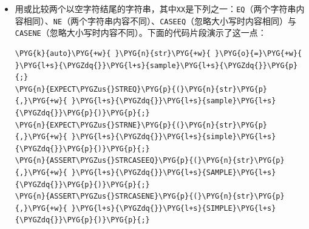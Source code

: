 \begin{itemize}
\begin{codeblockbg}
\begin{Verbatim}[commandchars=\\\{\},breaklines=true,breakanywhere=true,fontsize=\codefont,xleftmargin=17bp]
\PYG{k}{auto}\PYG{+w}{ }\PYG{n}{a}\PYG{+w}{ }\PYG{o}{=}\PYG{+w}{ }\PYG{l+m+mi}{42}\PYG{p}{,}\PYG{+w}{ }\PYG{n}{b}\PYG{+w}{ }\PYG{o}{=}\PYG{+w}{ }\PYG{l+m+mi}{10}\PYG{p}{;}
\PYG{n}{EXPECT\PYGZus{}EQ}\PYG{p}{(}\PYG{n}{a}\PYG{p}{,}\PYG{+w}{ }\PYG{l+m+mi}{42}\PYG{p}{)}\PYG{p}{;}
\PYG{n}{EXPECT\PYGZus{}NE}\PYG{p}{(}\PYG{n}{a}\PYG{p}{,}\PYG{+w}{ }\PYG{n}{b}\PYG{p}{)}\PYG{p}{;}
\PYG{n}{EXPECT\PYGZus{}LT}\PYG{p}{(}\PYG{n}{b}\PYG{p}{,}\PYG{+w}{ }\PYG{n}{a}\PYG{p}{)}\PYG{p}{;}
\PYG{n}{EXPECT\PYGZus{}LE}\PYG{p}{(}\PYG{n}{b}\PYG{p}{,}\PYG{+w}{ }\PYG{l+m+mi}{11}\PYG{p}{)}\PYG{p}{;}
\PYG{n}{EXPECT\PYGZus{}GT}\PYG{p}{(}\PYG{n}{a}\PYG{p}{,}\PYG{+w}{ }\PYG{n}{b}\PYG{p}{)}\PYG{p}{;}
\PYG{n}{EXPECT\PYGZus{}GE}\PYG{p}{(}\PYG{n}{b}\PYG{p}{,}\PYG{+w}{ }\PYG{l+m+mi}{10}\PYG{p}{)}\PYG{p}{;}
\end{Verbatim}
\end{codeblockbg}



\item 用或比较两个以空字符结尾的字符串，其中\texttt{XX}是下列之一：\texttt{EQ}（两个字符串内容相同）、\texttt{NE}（两个字符串内容不同）、\texttt{CASEEQ}（忽略大小写时内容相同）与\texttt{CASENE}（忽略大小写时内容不同）。下面的代码片段演示了这一点：



\begin{codeblockbg}
\begin{Verbatim}[commandchars=\\\{\},breaklines=true,breakanywhere=true,fontsize=\codefont,xleftmargin=17bp]
\PYG{k}{auto}\PYG{+w}{ }\PYG{n}{str}\PYG{+w}{ }\PYG{o}{=}\PYG{+w}{ }\PYG{l+s}{\PYGZdq{}}\PYG{l+s}{sample}\PYG{l+s}{\PYGZdq{}}\PYG{p}{;}
\PYG{n}{EXPECT\PYGZus{}STREQ}\PYG{p}{(}\PYG{n}{str}\PYG{p}{,}\PYG{+w}{ }\PYG{l+s}{\PYGZdq{}}\PYG{l+s}{sample}\PYG{l+s}{\PYGZdq{}}\PYG{p}{)}\PYG{p}{;}
\PYG{n}{EXPECT\PYGZus{}STRNE}\PYG{p}{(}\PYG{n}{str}\PYG{p}{,}\PYG{+w}{ }\PYG{l+s}{\PYGZdq{}}\PYG{l+s}{simple}\PYG{l+s}{\PYGZdq{}}\PYG{p}{)}\PYG{p}{;}
\PYG{n}{ASSERT\PYGZus{}STRCASEEQ}\PYG{p}{(}\PYG{n}{str}\PYG{p}{,}\PYG{+w}{ }\PYG{l+s}{\PYGZdq{}}\PYG{l+s}{SAMPLE}\PYG{l+s}{\PYGZdq{}}\PYG{p}{)}\PYG{p}{;}
\PYG{n}{ASSERT\PYGZus{}STRCASENE}\PYG{p}{(}\PYG{n}{str}\PYG{p}{,}\PYG{+w}{ }\PYG{l+s}{\PYGZdq{}}\PYG{l+s}{SIMPLE}\PYG{l+s}{\PYGZdq{}}\PYG{p}{)}\PYG{p}{;}
\end{Verbatim}
\end{codeblockbg}



\end{itemize}

